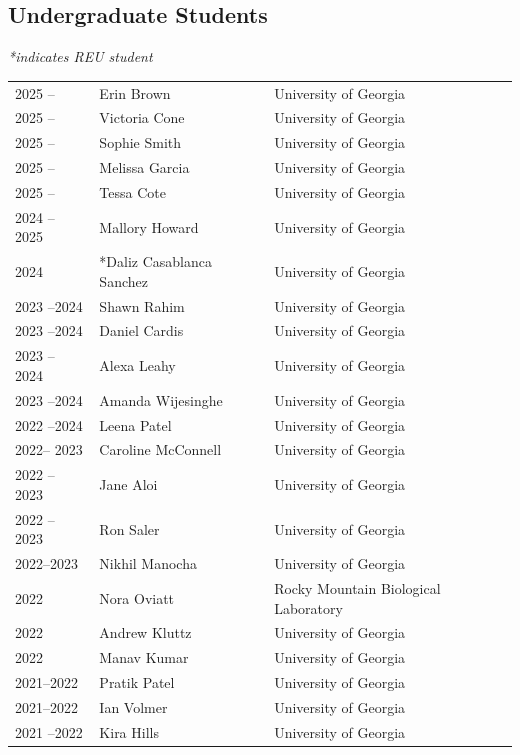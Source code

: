 \documentclass[letterpaper, 11pt]{article}
\begin{document}
 \subsection*{Undergraduate Students}
 \vspace{-0.50em}
 {\small\textit{*indicates REU student}}\\[0.50em]
 \begin{longtable}{YCL}
 2025 --  & Erin Brown & University of Georgia \\
 2025 --  & Victoria Cone & University of Georgia \\
 2025 --  & Sophie Smith & University of Georgia \\
 2025 --  & Melissa Garcia & University of Georgia \\
 2025 --  & Tessa Cote & University of Georgia \\
 2024 -- 2025 & Mallory Howard & University of Georgia \\
 2024 & *Daliz Casablanca Sanchez & University of Georgia \\
 2023 --2024 & Shawn Rahim & University of Georgia \\
 2023 --2024 & Daniel Cardis & University of Georgia \\
 2023 -- 2024 & Alexa Leahy & University of Georgia \\
 2023 --2024 & Amanda Wijesinghe & University of Georgia \\
 2022 --2024 & Leena Patel & University of Georgia \\
 2022-- 2023 & Caroline McConnell & University of Georgia \\
 2022 -- 2023 & Jane Aloi & University of Georgia \\
 2022 -- 2023 & Ron Saler & University of Georgia \\
 2022--2023 & Nikhil Manocha & University of Georgia \\
 2022 & Nora Oviatt & Rocky Mountain Biological Laboratory \\
 2022 & Andrew Kluttz & University of Georgia \\
 2022 & Manav Kumar & University of Georgia \\
 2021--2022 & Pratik Patel & University of Georgia \\
 2021--2022 & Ian Volmer & University of Georgia \\
 2021 --2022 & Kira Hills & University of Georgia \\

\end{longtable}
\end{document}
